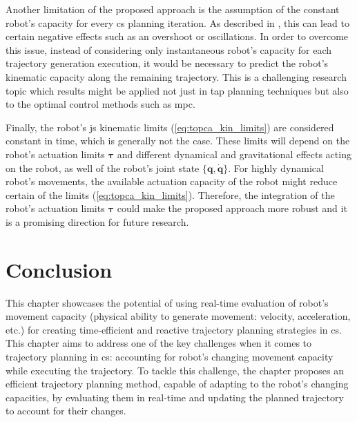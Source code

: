 Another limitation of the proposed approach is the assumption of the constant robot's capacity for every \gls{cs} planning iteration. As described in , this can lead to certain negative effects such as an overshoot or oscillations.  In order to overcome this issue, instead of considering only instantaneous robot's capacity for each trajectory generation execution, it would be necessary to predict the robot's kinematic capacity along the remaining trajectory. This is a challenging research topic which results might be applied not just in \gls{tap} planning techniques but also to the optimal control methods such as \gls{mpc}.  

Finally, the robot's \gls{js} kinematic limits (\ref{eq:topca_kin_limits}) are considered constant in time, which is generally not the case.
These limits will depend on the robot's actuation limits $\bm{\tau}$ and different dynamical and gravitational effects acting on the robot, as well of the robot's joint state $\{\bm{q},\dot{\bm{q}}\}$. For highly dynamical robot's movements, the available actuation capacity of the robot might reduce certain of the limits (\ref{eq:topca_kin_limits}). Therefore, the integration of the robot's actuation limits $\bm{\tau}$ could make the proposed approach more robust and it is a promising direction for future research. 

\section{Conclusion}

This chapter showcases the potential of using real-time evaluation of robot's movement capacity (physical ability to generate movement: velocity, acceleration, etc.) for creating time-efficient and reactive trajectory planning strategies in \gls{cs}. This chapter aims to address one of the key challenges when it comes to trajectory planning in \gls{cs}: accounting for robot's changing movement capacity while executing the trajectory. To tackle this challenge, the chapter proposes an efficient trajectory planning method, capable of adapting to the robot's changing capacities, by evaluating them in real-time and updating the planned trajectory to account for their changes. 

